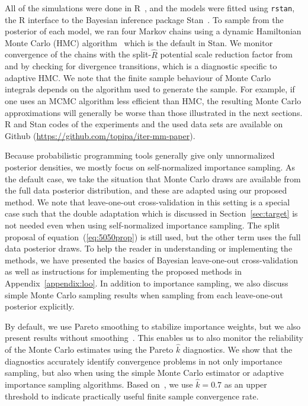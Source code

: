 \documentclass[12pt]{article}
\begin{document}
All of the simulations were done in R~\citep{rlang}, and
the models were fitted using \texttt{rstan}, 
the R interface to the Bayesian inference package Stan~\citep{carpenter2017stan,rstan}.
To sample from the posterior of each model, we ran four Markov chains using a dynamic Hamiltonian Monte Carlo (HMC)
algorithm~\citep{hoffman2014no,Betancourt2017} which is the default in Stan.
We monitor convergence of the chains with the split-$\widehat{R}$ potential scale reduction factor from~\citet{Vehtari+etal:2019:Rhat} and by checking for divergence transitions, which is a diagnostic
specific to adaptive HMC.
We note that the finite sample behaviour of Monte Carlo integrals
depends on the algorithm used to generate the sample.
For example, if one uses an MCMC algorithm less efficient than HMC, the
resulting Monte Carlo approximations will generally be worse than those illustrated in the next sections.
R and Stan codes of the experiments and the used data sets are available on Github (\url{https://github.com/topipa/iter-mm-paper}).


Because probabilistic programming tools generally give only unnormalized posterior densities,
we mostly focus on self-normalized importance sampling.
As the default case, we take the situation that Monte Carlo
draws are available from the full data posterior distribution, and these are adapted using our proposed
method. We note that leave-one-out cross-validation in this setting is a special case
such that the double adaptation which is discussed in Section~\ref{sec:target}
is not needed even when using self-normalized importance sampling.
The split proposal of equation~(\ref{eq:5050prop}) is still used, but
the other term uses the full data posterior draws.
To help the reader in understanding or implementing the methods,
we have presented
the basics of Bayesian leave-one-out cross-validation
as well as instructions for implementing the proposed methods in Appendix~\ref{appendix:loo}.
In addition to importance sampling, we also discuss simple Monte Carlo sampling results when sampling from each
leave-one-out posterior explicitly.


%
%
%
%
%
%
%
%
%
By default, we use Pareto smoothing to stabilize importance weights, but
we also present results without smoothing~\citep{vehtari2017practical,vehtari2015pareto}.
%
%
%
This enables us to also monitor the reliability of the Monte Carlo estimates
using the Pareto $\hat{k}$ diagnostics. We show that the
diagnostics accurately identify convergence problems
in not only importance sampling, but also when using the simple Monte Carlo estimator
or adaptive importance sampling algorithms.
Based on~\citet{vehtari2015pareto}, we use $\hat{k} = 0.7$ as
an upper threshold to indicate practically useful finite sample convergence rate.
\end{document}
